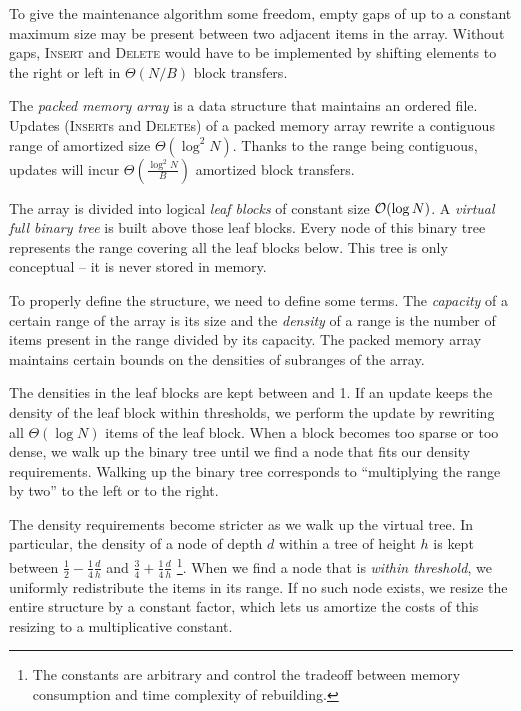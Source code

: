 To give the maintenance algorithm some freedom, empty gaps of up to a constant
maximum size may be present between two adjacent items in the array. Without
gaps, \textsc{Insert} and \textsc{Delete} would have to be implemented
by shifting elements to the right or left in $\Theta(N/B)$ block transfers.

The \emph{packed memory array} is a data structure that maintains an ordered
file. Updates (\textsc{Insert}s and \textsc{Delete}s) of a packed memory array
rewrite a contiguous range of amortized size $\Theta(\log^2 N)$.
Thanks to the range being contiguous, updates will incur
$\Theta(\frac{\log^2 N}{B})$ amortized block transfers.

The array is divided into logical \emph{leaf blocks} of constant size
$\mathcal{O}(\log N)$. A \emph{virtual full binary tree} is built above those leaf
blocks. Every node of this binary tree represents the range covering all
the leaf blocks below. This tree is only conceptual -- it is never stored
in memory.

To properly define the structure, we need to define some terms. The
\emph{capacity} of a certain range of the array is its size and the
\emph{density} of a range is the number of items present in the range divided
by its capacity.
The packed memory array maintains certain bounds on the densities of subranges
of the array.

The densities in the leaf blocks are kept between  %
and 1. If an update keeps the density of the leaf block within thresholds,
we perform the update by rewriting all $\Theta(\log N)$ items of the leaf block.
When a block becomes too sparse or too dense, we walk up the binary
tree until we find a node that fits our density requirements.
Walking up the binary tree corresponds to ``multiplying the range by two''
to the left or to the right.

The density requirements become stricter as we walk up the virtual tree.
In particular, the density of a node of depth $d$ within a tree of height $h$
is kept between $\frac{1}{2}-\frac{1}{4}\frac{d}{h}$ and $\frac{3}{4}+\frac{1}{4}\frac{d}{h}$
\footnote{The constants are arbitrary and control the tradeoff
between memory consumption and time complexity of rebuilding.}.
When we find a node that is \emph{within threshold}, we uniformly redistribute
the items in its range. If no such node exists, we resize the entire structure
by a constant factor, which lets us amortize the costs of this resizing to
a multiplicative constant.

